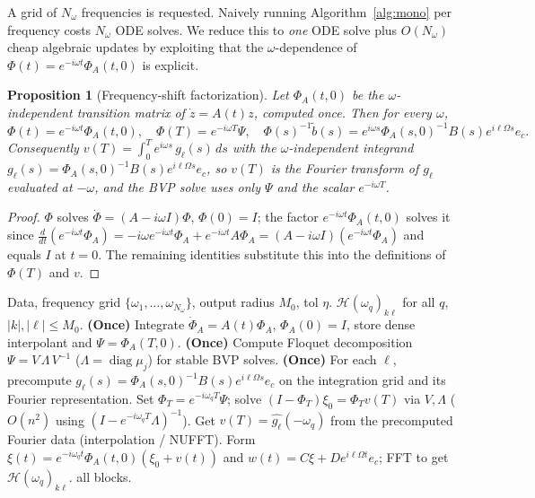 \documentclass{amsart}
\newtheorem{proposition}{Proposition}
\theoremstyle{definition}
\DeclareMathOperator{\diag}{diag}
\newcommand{\Hcal}{\mathcal{H}}
\begin{document}
A grid of $N_\omega$ frequencies is requested. Naively running
Algorithm~\ref{alg:mono} per frequency costs $N_\omega$ ODE solves. We reduce
this to \emph{one} ODE solve plus $O(N_\omega)$ cheap algebraic updates by
exploiting that the $\omega$-dependence of $\Phi(t)=e^{-i\omega t}\Phi_A(t,0)$ is
explicit.

\begin{proposition}[Frequency-shift factorization]\label{prop:shift}
Let $\Phi_A(t,0)$ be the $\omega$-independent transition matrix of
$\dot z=A(t)z$, computed once. Then for every $\omega$,
\begin{equation}\label{eq:shift}
\Phi(t)=e^{-i\omega t}\Phi_A(t,0),\quad
\Phi(T)=e^{-i\omega T}\Psi,\quad
\Phi(s)^{-1}\tilde b(s)=e^{i\omega s}\Phi_A(s,0)^{-1}B(s)e^{i\ell\Omega s}e_c .
\end{equation}
Consequently $v(T)=\int_0^T e^{i\omega s}\,g_\ell(s)\,ds$ with the
$\omega$-independent integrand $g_\ell(s)=\Phi_A(s,0)^{-1}B(s)e^{i\ell\Omega s}e_c$,
so $v(T)$ is the Fourier transform of $g_\ell$ evaluated at $-\omega$, and the
BVP solve uses only $\Psi$ and the scalar $e^{-i\omega T}$.
\end{proposition}

\begin{proof}
$\Phi$ solves $\dot\Phi=(A-i\omega I)\Phi$, $\Phi(0)=I$; the factor
$e^{-i\omega t}\Phi_A(t,0)$ solves it since
$\tfrac{d}{dt}(e^{-i\omega t}\Phi_A)=-i\omega e^{-i\omega t}\Phi_A+e^{-i\omega
t}A\Phi_A=(A-i\omega I)(e^{-i\omega t}\Phi_A)$ and equals $I$ at $t=0$. The
remaining identities substitute this into the definitions of $\Phi(T)$ and
$v$.
\end{proof}

\begin{algorithm}[H]
\caption{Fast HTF frequency sweep}\label{alg:sweep}
\begin{algorithmic}[1]
\Require Data, frequency grid $\{\omega_1,\dots,\omega_{N_\omega}\}$, output radius
$M_0$, tol $\eta$.
\Ensure $\Hcal(\omega_q)_{k\ell}$ for all $q$, $|k|,|\ell|\le M_0$.
\State \textbf{(Once)} Integrate $\dot\Phi_A=A(t)\Phi_A$, $\Phi_A(0)=I$, store
dense interpolant and $\Psi=\Phi_A(T,0)$.
\State \textbf{(Once)} Compute Floquet decomposition $\Psi=V\,\Lambda\,V^{-1}$
($\Lambda=\diag\mu_j$) for stable BVP solves.
\State \textbf{(Once)} For each $\ell$, precompute $g_\ell(s)=\Phi_A(s,0)^{-1}B(s)e^{i\ell\Omega s}e_c$
on the integration grid and its Fourier representation.
  \State Set $\Phi_T=e^{-i\omega_q T}\Psi$; solve $(I-\Phi_T)\xi_0=\Phi_T v(T)$
  via $V,\Lambda$ ($O(n^2)$ using $(I-e^{-i\omega_q T}\Lambda)^{-1}$).
  \State Get $v(T)=\widehat{g_\ell}(-\omega_q)$ from the precomputed Fourier data
  (interpolation / NUFFT).
  \State Form $\xi(t)=e^{-i\omega_q t}\Phi_A(t,0)(\xi_0+v(t))$ and
  $w(t)=C\xi+De^{i\ell\Omega t}e_c$; FFT to get $\Hcal(\omega_q)_{k\ell}$.
\EndFor
\State \Return all blocks.
\end{algorithmic}
\end{algorithm}
\end{document}
